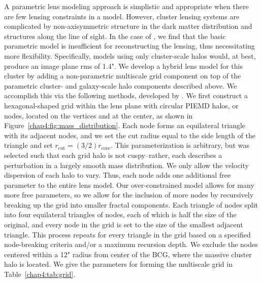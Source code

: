 A parametric lens modeling approach is simplistic and appropriate when there are few lensing constraints in a model. However, cluster lensing systems are complicated by non-axisymmetric structure in the dark matter distribution and structures along the line of sight. In the case of \cluster, we find that the basic parametric model is insufficient for reconstructing the lensing, thus necessitating more flexibility. Specifically, models using only cluster-scale halos would, at best, produce an image plane rms of 1.4". We develop a hybrid lens model for this cluster by adding a non-parametric multiscale grid component on top of the parametric cluster- and galaxy-scale halo components described above. We accomplish this via the following methods, developed by \citet{Jullo:2009ij}. We first construct a hexagonal-shaped grid within the lens plane with circular PIEMD halos, or nodes, located on the vertices and at the center, as shown in Figure~\ref{chap4:fig:mass_distribution}. Each node forms an equilateral triangle with its adjacent nodes, and we set the cut radius equal to the side length of the triangle and set $r_\mathrm{cut}=(3/2)r_\mathrm{core}$. This parameterization is arbitrary, but was selected such that each grid halo is not cuspy--rather, each describes a perturbation in a largely smooth mass distribution. We only allow the velocity dispersion of each halo to vary. Thus, each node adds one additional free parameter to the entire lens model. Our over-constrained model allows for many more free parameters, so we allow for the inclusion of more nodes by recursively breaking up the grid into smaller fractal components. Each triangle of nodes split into four equilateral triangles of nodes, each of which is half the size of the original, and every node in the grid is set to the size of the smallest adjacent triangle. This process repeats for every triangle in the grid based on a specified node-breaking criteria and/or a maximum recursion depth. We exclude the nodes centered within a 12" radius from center of the BCG, where the massive cluster halo is located. We give the parameters for forming the multiscale grid in Table~\ref{chap4:tab:grid}. 


